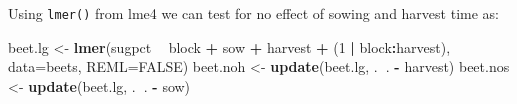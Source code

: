 \documentclass[
  ignorenonframetext,
]{beamer}
\newenvironment{Shaded}{\begin{snugshade}}{\end{snugshade}}
\newcommand{\DataTypeTok}[1]{\textcolor[rgb]{0.13,0.29,0.53}{#1}}
\newcommand{\DecValTok}[1]{\textcolor[rgb]{0.00,0.00,0.81}{#1}}
\newcommand{\KeywordTok}[1]{\textcolor[rgb]{0.13,0.29,0.53}{\textbf{#1}}}
\newcommand{\NormalTok}[1]{#1}
\newcommand{\OperatorTok}[1]{\textcolor[rgb]{0.81,0.36,0.00}{\textbf{#1}}}
\newcommand{\OtherTok}[1]{\textcolor[rgb]{0.56,0.35,0.01}{#1}}
\newcommand{\StringTok}[1]{\textcolor[rgb]{0.31,0.60,0.02}{#1}}
\begin{document}
\begin{frame}[fragile]

Using \texttt{lmer()} from lme4 we can test for no effect of sowing and
harvest time as:

\small

\begin{Shaded}
\begin{Highlighting}[]
\NormalTok{beet.lg <-}\StringTok{ }\KeywordTok{lmer}\NormalTok{(sugpct }\OperatorTok{~}\StringTok{ }\NormalTok{block }\OperatorTok{+}\StringTok{ }\NormalTok{sow }\OperatorTok{+}\StringTok{ }\NormalTok{harvest }\OperatorTok{+}
\StringTok{                      }\NormalTok{(}\DecValTok{1} \OperatorTok{|}\StringTok{ }\NormalTok{block}\OperatorTok{:}\NormalTok{harvest), }\DataTypeTok{data=}\NormalTok{beets, }\DataTypeTok{REML=}\OtherTok{FALSE}\NormalTok{)}
\NormalTok{beet.noh <-}\StringTok{ }\KeywordTok{update}\NormalTok{(beet.lg, .}\OperatorTok{~}\NormalTok{. }\OperatorTok{-}\StringTok{ }\NormalTok{harvest)}
\NormalTok{beet.nos  <-}\StringTok{ }\KeywordTok{update}\NormalTok{(beet.lg, .}\OperatorTok{~}\NormalTok{. }\OperatorTok{-}\StringTok{ }\NormalTok{sow) }
\end{Highlighting}
\end{Shaded}

\normalsize

\end{frame}
\end{document}
